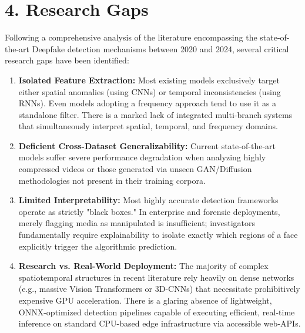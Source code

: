 \documentclass[12pt,a4paper]{article}
\begin{document}
\section{4. Research Gaps}
Following a comprehensive analysis of the literature encompassing the state-of-the-art Deepfake detection mechanisms between 2020 and 2024, several critical research gaps have been identified:

\begin{enumerate}
\item \textbf{Isolated Feature Extraction:} Most existing models exclusively target either spatial anomalies (using CNNs) or temporal inconsistencies (using RNNs). Even models adopting a frequency approach tend to use it as a standalone filter. There is a marked lack of integrated multi-branch systems that simultaneously interpret spatial, temporal, and frequency domains.
\item \textbf{Deficient Cross-Dataset Generalizability:} Current state-of-the-art models suffer severe performance degradation when analyzing highly compressed videos or those generated via unseen GAN/Diffusion methodologies not present in their training corpora.
\item \textbf{Limited Interpretability:} Most highly accurate detection frameworks operate as strictly "black boxes." In enterprise and forensic deployments, merely flagging media as manipulated is insufficient; investigators fundamentally require explainability to isolate exactly which regions of a face explicitly trigger the algorithmic prediction.
\item \textbf{Research vs. Real-World Deployment:} The majority of complex spatiotemporal structures in recent literature rely heavily on dense networks (e.g., massive Vision Transformers or 3D-CNNs) that necessitate prohibitively expensive GPU acceleration. There is a glaring absence of lightweight, ONNX-optimized detection pipelines capable of executing efficient, real-time inference on standard CPU-based edge infrastructure via accessible web-APIs.
\end{enumerate}
\end{document}
